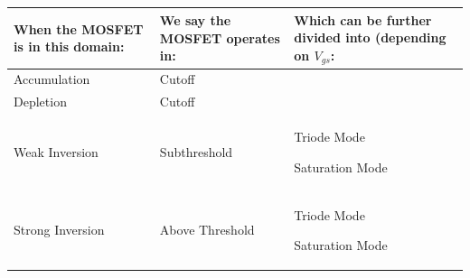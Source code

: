 \documentclass[main]{subfiles}
\begin{document}
\begin{longtable}{ |p{4cm}|p{4cm}|p{4cm}| }
\hline
\textbf{When the MOSFET is in this domain:} & \textbf{We say the MOSFET operates in:} & \textbf{Which can be further divided into (depending on $V_{gs}$:} \\ \hline
\endhead
Accumulation & Cutoff & \\ \hline
Depletion & Cutoff & \\ \hline

Weak Inversion & Subthreshold & Triode Mode \par Saturation Mode\\ \hline
 Strong Inversion & Above Threshold & Triode Mode \par Saturation Mode\\ \hline
\end{longtable}
\end{document}
